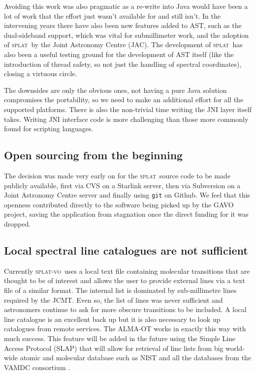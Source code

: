 \documentclass[final,authoryear,5p,times,twocolumn]{elsarticle}
\newcommand{\splat}{\textsc{splat}}
\newcommand{\splatvo}{\textsc{splat-vo}}
\begin{document}
Avoiding this work was also pragmatic as a re-write into Java would
have been a lot of work that the effort just wasn't available for and
still isn't. In the intervening years there have also been new
features added to AST, such as the dual-sideband support, which was
vital for submillimeter work, and the adoption of \splat\ by the
Joint Astronomy Centre (JAC). The development of \splat\ has also been a useful testing ground
for the development of AST itself (like the introduction of thread
safety, so not just the handling of spectral coordinates), closing a
virtuous circle.

The downsides are only the obvious ones, not having a pure Java
solution compromises the portability, so we need to make an additional
effort for all the supported platforms. There is also the non-trivial
time writing the JNI layer itself takes. Writing JNI interface code is
more challenging than those more commonly found for scripting
languages.

\subsection{Open sourcing from the beginning}

The decision was made very early on for the \splat\ source code to be
made publicly available, first via CVS on a Starlink server, then via
Subversion on a Joint Astronomy Centre server and finally using \texttt{git}
on Github. We feel that this openness contributed directly to the
software being picked up by the GAVO project, saving the application
from stagnation once the direct funding for it was dropped.

\subsection{Local spectral line catalogues are not sufficient}

Currently \splatvo\ uses a local text file containing molecular
transitions that are thought to be of interest and allows the user to
provide external lines via a text file of a similar format. The
internal list is dominated by sub-millimetre lines required by the
JCMT. Even so, the list of lines was never sufficient and astronomers
continue to ask for more obscure transitions to be included. A local
line catalogue is an excellent back up but it is also necessary to
look up catalogues from remote services. The ALMA-OT
\citep{2013ASPC..475..373W} works in exactly this way with much
success. This feature will be added in the future using the Simple
Line Access Protocol (SLAP) that will allow for retrieval of line
lists from big world-wide atomic and molecular database such as NIST
\citep{NIST_ASD,2012APS..DMP.D1004K,2004JPCRD..33..177L} and all the
databases from the VAMDC consortium \citep{2011BaltA..20..503K}.
\end{document}
